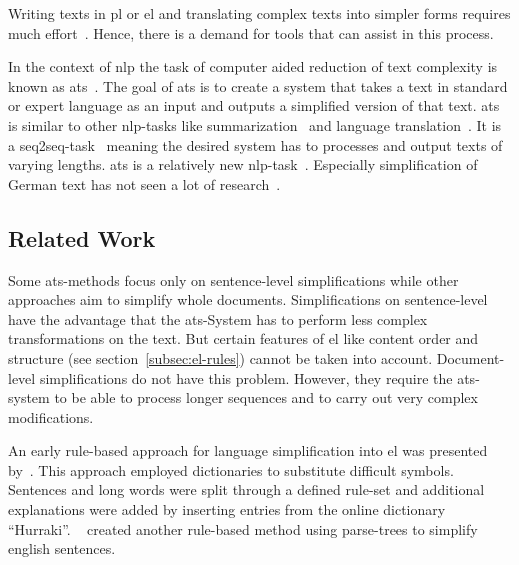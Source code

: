Writing texts in \gls{pl} or \gls{el} and translating complex texts into simpler forms requires much effort~\autocite{easyLanguageBook}.
Hence, there is a demand for tools that can assist in this process.

In the context of \gls{nlp} the task of computer aided reduction of text complexity is known as \gls{ats}~\autocite{Ansch_tz_2023}.
The goal of \gls{ats} is to create a system that takes a text in standard or expert language as an input and outputs a simplified version of that text.
\gls{ats} is similar to other \gls{nlp}-tasks like summarization~\autocite{rios-etal-2021-new} and language translation~\autocite{aumiller2022klexikon}.
It is a \gls{seq2seq}-task~\autocite{Ansch_tz_2023} meaning the desired system has to processes and output texts of varying lengths.
\gls{ats} is a relatively new \gls{nlp}-task~\autocite{schomacker2023data}.
Especially simplification of German text has not seen a lot of research~\autocite{Ansch_tz_2023}.

\subsection{Related Work}\label{subsec:related-work}

Some \gls{ats}-methods focus only on sentence-level simplifications while other approaches aim to simplify whole documents.
Simplifications on sentence-level have the advantage that the \gls{ats}-System has to perform less complex transformations on the text.
But certain features of \gls{el} like content order and structure (see section~\ref{subsec:el-rules}) cannot be taken into account. %
Document-level simplifications do not have this problem.
However, they require the \gls{ats}-system to be able to process longer sequences and to carry out very complex modifications.

An early rule-based approach for language simplification into \gls{el} was presented by~\autocite{suter2016}.
This approach employed dictionaries to substitute difficult symbols.
Sentences and long words were split through a defined rule-set and additional explanations were added by inserting entries from the online dictionary \enquote{Hurraki}.
~\autocite{Garain2019} created another rule-based method using parse-trees to simplify english sentences.

